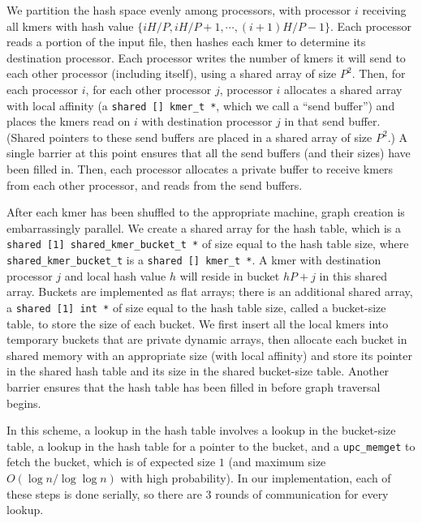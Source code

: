 \documentclass{article}
\begin{document}
We partition the hash space evenly among processors, with processor $i$ receiving all kmers with hash value $\{iH/P, iH/P+1, \cdots, (i+1)H/P-1\}$.  Each processor reads a portion of the input file, then hashes each kmer to determine its destination processor.  Each processor writes the number of kmers it will send to each other processor (including itself), using a shared array of size $P^2$.  Then, for each processor $i$, for each other processor $j$, processor $i$ allocates a shared array with local affinity (a \texttt{shared [] kmer\_t *}, which we call a ``send buffer'') and places the kmers read on $i$ with destination processor $j$ in that send buffer.  (Shared pointers to these send buffers are placed in a shared array of size $P^2$.)  A single barrier at this point ensures that all the send buffers (and their sizes) have been filled in.  Then, each processor allocates a private buffer to receive kmers from each other processor, and reads from the send buffers.

After each kmer has been shuffled to the appropriate machine, graph creation is embarrassingly parallel.  We create a shared array for the hash table, which is a \texttt{shared [1] shared\_kmer\_bucket\_t *} of size equal to the hash table size, where \texttt{shared\_kmer\_bucket\_t} is a \texttt{shared [] kmer\_t *}.  A kmer with destination processor $j$ and local hash value $h$ will reside in bucket $hP+j$ in this shared array.  Buckets are implemented as flat arrays; there is an additional shared array, a \texttt{shared [1] int *} of size equal to the hash table size, called a bucket-size table, to store the size of each bucket.  We first insert all the local kmers into temporary buckets that are private dynamic arrays, then allocate each bucket in shared memory with an appropriate size (with local affinity) and store its pointer in the shared hash table and its size in the shared bucket-size table.  Another barrier ensures that the hash table has been filled in before graph traversal begins.

In this scheme, a lookup in the hash table involves a lookup in the bucket-size table, a lookup in the hash table for a pointer to the bucket, and a \texttt{upc\_memget} to fetch the bucket, which is of expected size $1$ (and maximum size $O(\log n / \log \log n)$ with high probability).  In our implementation, each of these steps is done serially, so there are $3$ rounds of communication for every lookup.
\end{document}
